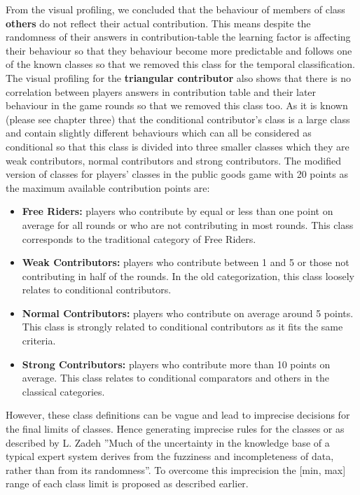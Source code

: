 From the visual profiling, we concluded that the behaviour of members of class \textbf{others} do not reflect their actual contribution. This means despite the randomness of their answers in contribution-table the learning factor is affecting their behaviour so that they behaviour become more predictable and follows one of the known classes so that we removed this class for the temporal classification. The visual profiling for the \textbf{triangular contributor} also shows that there is no correlation between players answers in contribution table and their later behaviour in the game rounds so that we removed this class too. As it is known (please see chapter three) that the conditional contributor's class is a large class and contain slightly different behaviours which can all be considered as conditional so that this class is divided into three smaller classes which they are weak contributors, normal contributors and strong contributors. The modified version of classes for players' classes in the public goods game with 20 points as the maximum available contribution points are:

\begin{itemize}
    \item \textbf{Free Riders:} players who contribute by equal or less than one point on average for all rounds or who are not contributing in most rounds. This class corresponds to the traditional category of Free Riders. 
    \item \textbf{Weak Contributors:} players who contribute between 1 and 5 or those not contributing in half of the rounds. In the old categorization, this class loosely relates to conditional contributors.
    \item \textbf{Normal Contributors:} players who contribute on average around 5 points. This class is strongly related to conditional contributors as it fits the same criteria.
    \item \textbf{Strong Contributors:} players who contribute more than 10 points on average. This class relates to conditional comparators and others in the classical categories.
\end{itemize}

However, these class definitions can be vague and lead to imprecise decisions for the final limits of classes. Hence generating imprecise rules for the classes or as described by L. Zadeh \cite{Zadeh1984} ''Much of the uncertainty in the knowledge base of a typical expert system derives from the fuzziness and incompleteness of data, rather than from its randomness''. To overcome this imprecision the [min, max] range of each class limit is proposed as described earlier. 



